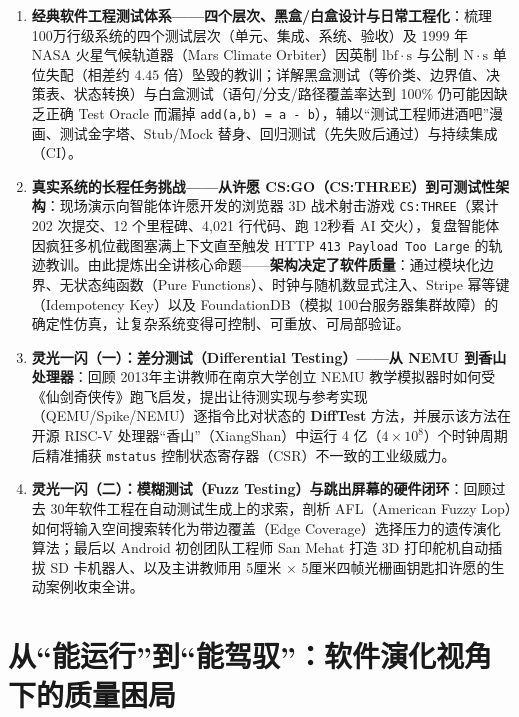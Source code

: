 \documentclass[a4paper]{article}
\begin{document}
\begin{enumerate}
    \item \textbf{经典软件工程测试体系——四个层次、黑盒/白盒设计与日常工程化}：梳理 100万行级系统的四个测试层次（单元、集成、系统、验收）及 1999 年 NASA 火星气候轨道器（Mars Climate Orbiter）因英制 $\mathrm{lbf\cdot s}$ 与公制 $\mathrm{N\cdot s}$ 单位失配（相差约 $4.45$ 倍）坠毁的教训；详解黑盒测试（等价类、边界值、决策表、状态转换）与白盒测试（语句/分支/路径覆盖率达到 100\% 仍可能因缺乏正确 Test Oracle 而漏掉 \texttt{add(a,b) = a - b}），辅以“测试工程师进酒吧”漫画、测试金字塔、Stub/Mock 替身、回归测试（先失败后通过）与持续集成（CI）。
    \item \textbf{真实系统的长程任务挑战——从许愿 CS:GO（CS:THREE）到可测试性架构}：现场演示向智能体许愿开发的浏览器 3D 战术射击游戏 \texttt{CS:THREE}（累计 202 次提交、12 个里程碑、4,021 行代码、跑 12秒看 AI 交火），复盘智能体因疯狂多机位截图塞满上下文直至触发 HTTP \texttt{413 Payload Too Large} 的轨迹教训。由此提炼出全讲核心命题——\textbf{架构决定了软件质量}：通过模块化边界、无状态纯函数（Pure Functions）、时钟与随机数显式注入、Stripe 幂等键（Idempotency Key）以及 FoundationDB（模拟 100台服务器集群故障）的确定性仿真，让复杂系统变得可控制、可重放、可局部验证。
    \item \textbf{灵光一闪（一）：差分测试（Differential Testing）——从 NEMU 到香山处理器}：回顾 2013年主讲教师在南京大学创立 NEMU 教学模拟器时如何受《仙剑奇侠传》跑飞启发，提出让待测实现与参考实现（QEMU/Spike/NEMU）逐指令比对状态的 \textbf{DiffTest} 方法，并展示该方法在开源 RISC-V 处理器“香山”（XiangShan）中运行 4 亿（$4 \times 10^8$）个时钟周期后精准捕获 \texttt{mstatus} 控制状态寄存器（CSR）不一致的工业级威力。
    \item \textbf{灵光一闪（二）：模糊测试（Fuzz Testing）与跳出屏幕的硬件闭环}：回顾过去 30年软件工程在自动测试生成上的求索，剖析 AFL（American Fuzzy Lop）如何将输入空间搜索转化为带边覆盖（Edge Coverage）选择压力的遗传演化算法；最后以 Android 初创团队工程师 San Mehat 打造 3D 打印舵机自动插拔 SD 卡机器人、以及主讲教师用 5厘米 $\times$ 5厘米四帧光栅画钥匙扣许愿的生动案例收束全讲。
\end{enumerate}

\newpage
\tableofcontents
\newpage

\section{从“能运行”到“能驾驭”：软件演化视角下的质量困局}
\end{document}
